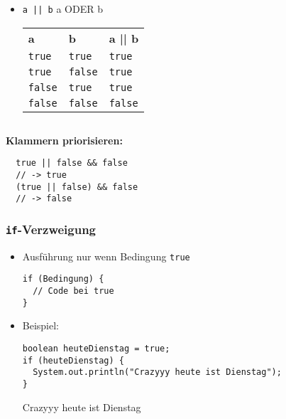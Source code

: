 \documentclass{../../presentation}
\begin{document}
\begin{frame}[fragile]
\begin{columns}
    \begin{column}{0.5\textwidth}
      \newline
      \pause
      \begin{itemize}
        \item \texttt{a || b} \quad \textrightarrow \quad a ODER b\\[0.3em]
              \pause
              {
                \begin{tabular}{l l l}
                  \rowcolor{tablehead}
                  \textbf{a}     & \textbf{b}     & \textbf{a || b} \\
                  \texttt{true}  & \texttt{true}  & \texttt{true}   \\
                  \texttt{true}  & \texttt{false} & \texttt{true}   \\
                  \texttt{false} & \texttt{true}  & \texttt{true}   \\
                  \texttt{false} & \texttt{false} & \texttt{false}  \\
                \end{tabular}
              }
      \end{itemize}
    \end{column}
  \end{columns}
  \vspace{0.5cm}
  \pause
  \textbf{Klammern priorisieren:}
  \begin{verbatim}
  true || false && false 
  // -> true
  (true || false) && false
  // -> false
  \end{verbatim}
\end{frame}

\begin{frame}[fragile]
  \frametitle{\texttt{if}-Verzweigung}

  \begin{itemize}
    \item<1-> Ausführung nur wenn Bedingung \texttt{true}
          \begin{verbatim}
if (Bedingung) {
  // Code bei true
}
      \end{verbatim}
    \item<2-> Beispiel:
          \begin{verbatim}
boolean heuteDienstag = true;
if (heuteDienstag) {
  System.out.println("Crazyyy heute ist Dienstag");
}
      \end{verbatim}
          \begin{ausgabe}
            Crazyyy heute ist Dienstag
          \end{ausgabe}
  \end{itemize}
\end{frame}
\end{document}
